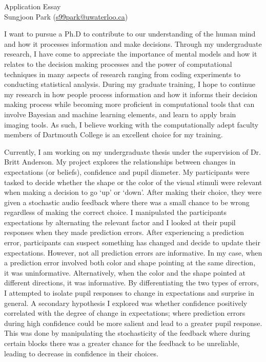 \documentclass[12pt]{article}
\let\oldcenter\center
\let\oldendcenter\endcenter
\renewenvironment{center}{\setlength\topsep{-1pt}\oldcenter}{\oldendcenter}
\begin{document}
	
	\begin{center}
		{\Large Application Essay} \\
		{\normalsize Sungjoon Park (\href{mailto:s99park@uwaterloo.ca}{s99park@uwaterloo.ca})}
	\end{center}
	
	I want to pursue a Ph.D to contribute to our understanding of the human mind and how it processes information and make decisions. Through my undergraduate research, I have come to appreciate the importance of mental models and how it relates to the decision making processes and the power of computational techniques in many aspects of research ranging from coding experiments to conducting statistical analysis. During my graduate training, I hope to continue my research in how people process information and how it informs their decision making process while becoming more proficient in computational tools that can involve Bayesian and machine learning elements, and learn to apply brain imaging tools. As such, I believe working with the computationally adept faculty members of Dartmouth College is an excellent choice for my training.
	
	Currently, I am working on my undergraduate thesis under the supervision of Dr. Britt Anderson. My project explores the relationships between changes in expectations (or beliefs), confidence and pupil diameter. My participants were tasked to decide whether the shape or the color of the visual stimuli were relevant when making a decision to go `up' or `down'. After making their choice, they were given a stochastic audio feedback where there was a small chance to be wrong regardless of making the correct choice. I manipulated the participants expectations by alternating the relevant factor and I looked at their pupil responses when they made prediction errors. After experiencing a prediction error, participants can suspect something has changed and decide to update their expectations. However, not all prediction errors are informative. In my case, when a prediction error involved both color and shape pointing at the same direction, it was uninformative. Alternatively, when the color and the shape pointed at different directions, it was informative. By differentiating the two types of errors, I attempted to isolate pupil responses to change in expectations and surprise in general. A secondary hypothesis I explored was whether confidence positively correlated with the degree of change in expectations; where prediction errors during high confidence could be more salient and lead to a greater pupil response. This was done by manipulating the stochasticity of the feedback where during certain blocks there was a greater chance for the feedback to be unreliable, leading to decrease in confidence in their choices.
	
\end{document}
